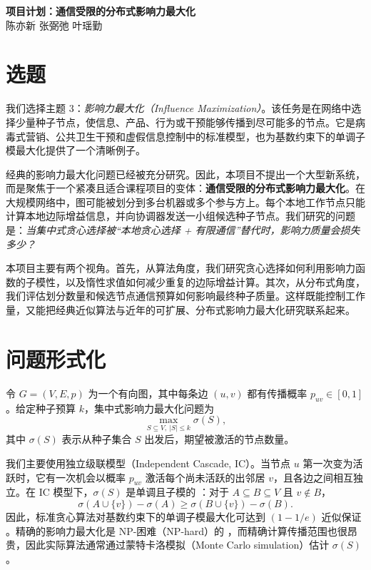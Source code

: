 \documentclass[10pt]{ctexart}
\begin{document}
\begin{center}
{\large\bfseries 项目计划：通信受限的分布式影响力最大化}\vspace{1mm}\\
陈亦新 \quad 张弼弛 \quad 叶瑶勤
\end{center}
\vspace{-3mm}

\section{选题}
我们选择主题 3：\emph{影响力最大化（Influence Maximization）}。该任务是在网络中选择少量种子节点，使信息、产品、行为或干预能够传播到尽可能多的节点。它是病毒式营销、公共卫生干预和虚假信息控制中的标准模型，也为基数约束下的单调子模最大化提供了一个清晰例子。

经典的影响力最大化问题已经被充分研究。因此，本项目不提出一个大型新系统，而是聚焦于一个紧凑且适合课程项目的变体：\textbf{通信受限的分布式影响力最大化}。在大规模网络中，图可能被划分到多台机器或多个参与方上。每个本地工作节点只能计算本地边际增益信息，并向协调器发送一小组候选种子节点。我们研究的问题是：\emph{当集中式贪心选择被“本地贪心选择 + 有限通信”替代时，影响力质量会损失多少？}

本项目主要有两个视角。首先，从算法角度，我们研究贪心选择如何利用影响力函数的子模性，以及惰性求值如何减少重复的边际增益计算。其次，从分布式角度，我们评估划分数量和候选节点通信预算如何影响最终种子质量。这样既能控制工作量，又能把经典近似算法与近年的可扩展、分布式影响力最大化研究联系起来。

\section{问题形式化}
令 $G=(V,E,p)$ 为一个有向图，其中每条边 $(u,v)$ 都有传播概率 $p_{uv}\in[0,1]$。给定种子预算 $k$，集中式影响力最大化问题为
\[
\max_{S\subseteq V,\ |S|\le k}\sigma(S),
\]
其中 $\sigma(S)$ 表示从种子集合 $S$ 出发后，期望被激活的节点数量。

我们主要使用独立级联模型（Independent Cascade, IC）。当节点 $u$ 第一次变为活跃时，它有一次机会以概率 $p_{uv}$ 激活每个尚未活跃的出邻居 $v$，且各边之间相互独立。在 IC 模型下，$\sigma(S)$ 是单调且子模的 \cite{kempe2003maximizing}：对于 $A\subseteq B\subseteq V$ 且 $v\notin B$，
\[
\sigma(A\cup\{v\})-\sigma(A)\ge \sigma(B\cup\{v\})-\sigma(B).
\]
因此，标准贪心算法对基数约束下的单调子模最大化可达到 $(1-1/e)$ 近似保证 \cite{nemhauser1978analysis}。精确的影响力最大化是 NP-困难（NP-hard）的 \cite{kempe2003maximizing}，而精确计算传播范围也很昂贵，因此实际算法通常通过蒙特卡洛模拟（Monte Carlo simulation）估计 $\sigma(S)$。
\end{document}
